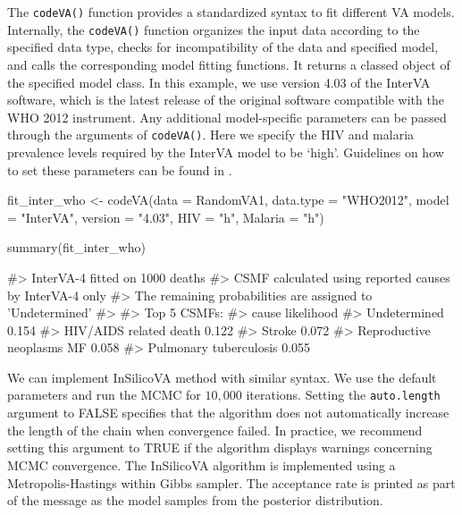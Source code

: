 The \texttt{codeVA()} function provides a standardized syntax to fit
different VA models. Internally, the \texttt{codeVA()} function
organizes the input data according to the specified data type, checks
for incompatibility of the data and specified model, and calls the
corresponding model fitting functions. It returns a classed object of
the specified model class. In this example, we use version 4.03 of the
InterVA software, which is the latest release of the original software
compatible with the WHO 2012 instrument. Any additional model-specific
parameters can be passed through the arguments of \texttt{codeVA()}.
Here we specify the HIV and malaria prevalence levels required by the
InterVA model to be `high'. Guidelines on how to set these parameters
can be found in \citet{byass2012strengthening}.

\begin{Schunk}
\begin{Sinput}
fit_inter_who <- codeVA(data = RandomVA1, data.type = "WHO2012", 
                        model = "InterVA", version = "4.03", 
                        HIV = "h", Malaria = "h")
\end{Sinput}
\end{Schunk}

\begin{Schunk}
\begin{Sinput}
summary(fit_inter_who) 
\end{Sinput}
\begin{Soutput}
#> InterVA-4 fitted on 1000 deaths
#> CSMF calculated using reported causes by InterVA-4 only
#> The remaining probabilities are assigned to 'Undetermined'
#> 
#> Top 5 CSMFs:
#>  cause                     likelihood
#>  Undetermined              0.154     
#>  HIV/AIDS related death    0.122     
#>  Stroke                    0.072     
#>  Reproductive neoplasms MF 0.058     
#>  Pulmonary tuberculosis    0.055
\end{Soutput}
\end{Schunk}

We can implement InSilicoVA method with similar syntax. We use the
default parameters and run the MCMC for \(10,000\) iterations. Setting
the \texttt{auto.length} argument to FALSE specifies that the algorithm
does not automatically increase the length of the chain when convergence
failed. In practice, we recommend setting this argument to TRUE if the
algorithm displays warnings concerning MCMC convergence. The InSilicoVA
algorithm is implemented using a Metropolis-Hastings within Gibbs
sampler. The acceptance rate is printed as part of the message as the
model samples from the posterior distribution.

